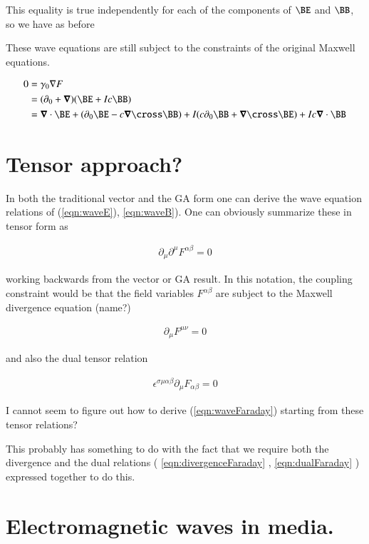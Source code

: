 \documentclass{article}
\begin{document}
This equality is true independently for each of the components of $\BE$ and $\BB$, so we have as before

These wave equations are still subject to the constraints of the original Maxwell equations.  

\begin{align*}
0 &= \gamma_0 \grad F \\
&= (\partial_0 + \spacegrad) (\BE + I c \BB) \\
&= 
  \spacegrad \cdot \BE 
+ (\partial_0 \BE - c \spacegrad \cross \BB)
+ I ( c \partial_0 \BB + \spacegrad \cross \BE )
+ I c \spacegrad \cdot \BB 
\\
\end{align*}

\section{Tensor approach?}

In both the traditional vector and the GA form one can derive the wave equation relations 
of (\ref{eqn:waveE}), \ref{eqn:waveB}).  One can obviously summarize these in tensor form as

\begin{align}\label{eqn:waveFaraday}
\partial_\mu\partial^\mu F^{\alpha\beta} = 0
\end{align}

working backwards from the vector or GA result.  In this notation, the coupling constraint would be that the field variables
$F^{\alpha\beta}$ are subject to the Maxwell divergence equation (name?)

\begin{align}\label{eqn:divergenceFaraday}
\partial_\mu F^{\mu\nu} = 0
\end{align}

and also the dual tensor relation

\begin{align}\label{eqn:dualFaraday}
\epsilon^{\sigma\mu\alpha\beta} \partial_\mu F_{\alpha\beta} = 0
\end{align}

I cannot seem to figure out how to derive (\ref{eqn:waveFaraday}) starting from these tensor relations?

This probably has something to do with the fact that we require both the divergence and the dual relations 
(
\ref{eqn:divergenceFaraday}
,
\ref{eqn:dualFaraday}
)
expressed together to do this.

\section{Electromagnetic waves in media.}
\end{document}
